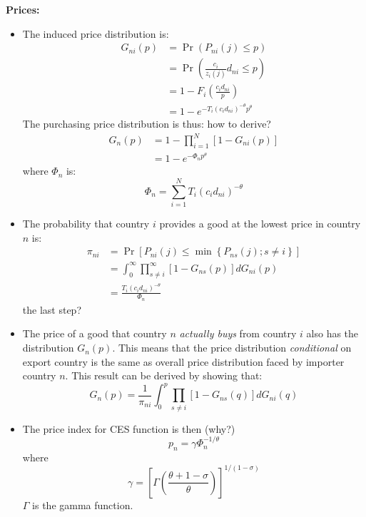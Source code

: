 \documentclass{book}
\theoremstyle{plain}
\theoremstyle{definition}
\newcommand{\red}[1]{{\color{red} #1}}
\newcommand{\mysubtitle}[1]{{\normalsize{\textbf{#1}}}}
\begin{document}
\mysubtitle{Prices:}
\begin{itemize}
	\item The induced price distribution is:
	\begin{align*}
		G _ { n i } ( p )
		& = \Pr \left( P _ { n i } ( j ) \leq p \right) \\
		& =  \Pr(\frac{c_i}{z_i(j)}d_{ni} \leq p) \\
		& = 1-F_i(\frac{c_i d_{ni}}{p}) \\
		& = 1 - e^{-T_i(c_i d_{ni})^{-\theta}p^{\theta}}
	\end{align*}
	The purchasing price distribution is thus: \red{how to derive?}
	\begin{align*}
		G _ { n } ( p ) & = 1 - \prod _ { i = 1 } ^ { N } \left[ 1 - G _ { n i } ( p ) \right] \\
		& = 1 - e ^ { - \Phi _ { n } p ^ { \theta } }
	\end{align*}
	where $\Phi_n$ is:
	\[\Phi _ { n } = \sum _ { i = 1 } ^ { N } T _ { i } \left( c _ { i } d _ { n i } \right) ^ { - \theta }\]

	\item The probability that country $i$ provides a good at the lowest price in country $n$ is:
	\begin{align*}
	\pi _ { n i } &= \operatorname { Pr } \left[ P _ { n i } ( j ) \leq \min \left\{ P _ { n s } ( j ) ; s \neq i \right\} \right] \\
	& = \int _ { 0 } ^ { \infty } \prod _ { s \neq i } ^ { \infty }  \left[ 1 - G _ { n s } ( p ) \right] d G _ { n i } ( p ) \\
	&= \frac { T _ { i } \left( c _ { i } d _ { n i } \right) ^ { - \theta } } { \Phi _ { n } }
	\end{align*}
	\red{the last step?}

	\item The price of a good that country $n$ \textit{actually buys} from country $i$ also has the distribution $G_n(p)$. This means that the price distribution \textit{conditional} on export country is the same as overall price distribution faced by importer country $n$. This result can be derived by showing that:
	\[G _ { n } ( p ) = \frac { 1 } { \pi _ { n i } } \int _ { 0 } ^ { p } \prod _ { s \neq i } \left[ 1 - G _ { n s } ( q ) \right] d G _ { n i } ( q )\]

	\item The price index for CES function is then \red{(why?)}
	\[p _ { n } = \gamma \Phi _ { n } ^ { - 1 / \theta } \tag{9}\]
	where 
	\[\gamma = \left[ \Gamma \left( \frac { \theta + 1 - \sigma } { \theta } \right) \right] ^ { 1 / ( 1 - \sigma ) }\]
	$\Gamma$ is the gamma function.
	
\end{itemize}
\end{document}
